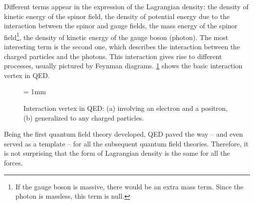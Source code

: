 Different terms appear in the expression of the Lagrangian density: the density of kinetic energy of the spinor field, the density of potential energy due to the interaction between the spinor and gauge fields, the mass energy of the spinor field\footnote{If the gauge boson is massive, there would be an extra mass term. Since the photon is massless, this term is null.}, the density of kinetic energy of the gauge boson (photon). The most interesting term is the second one, which describes the interaction between the charged particles and the photons. This interaction gives rise to different processes, usually pictured by Feynman diagrams. \Fig\ref{fig:FeynmanDiagramQED} shows the basic interaction vertex in QED.

\begin{figure}[H]
\begin{center}
\unitlength = 1mm
\end{center}
\caption{Interaction vertex in QED: (a) involving an electron and a positron, (b) generalized to any charged particles.}
\label{fig:FeynmanDiagramQED}
\end{figure}



Being the first quantum field theory developed, QED paved the way -- and even served as a template -- for all the subsequent quantum field theories. Therefore, it is not surprising that the form of Lagrangian density is the same for all the forces. 

